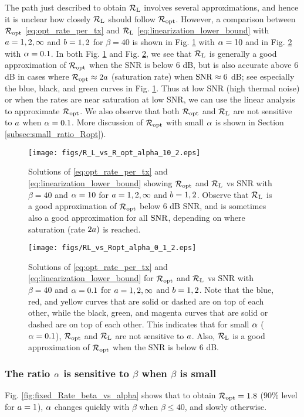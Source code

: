 \documentclass[12pt, draftclsnofoot,journal,onecolumn]{IEEEtran}
\begin{document}
The path just described to obtain $\mathcal{R}_{\rm L}$ involves several approximations, and hence it is unclear how closely $\mathcal{R}_{\rm L}$ should follow $\mathcal{R}_{\rm opt}$.
However, a comparison between $\mathcal{R}_{\rm opt}$ \eqref{eq:opt_rate_per_tx} and $\mathcal{R}_{\rm L}$ \eqref{eq:linearization_lower_bound} with $a=1, 2, \infty$ and $b=1, 2$ for $\beta= 40$ is shown in Fig. \ref{fig:compare_with_Bussgang} with $\alpha=10$ and in Fig. \ref{fig:RL_vs_Ropt_alpha_0.1} with $\alpha=0.1$. In both Fig. \ref{fig:compare_with_Bussgang} and Fig. \ref{fig:RL_vs_Ropt_alpha_0.1}, we see that $\mathcal{R}_{\rm L}$ is generally a good approximation of $\mathcal{R}_{\rm opt}$ when the SNR is below 6 dB, but is also accurate above 6 dB in cases where $\mathcal{R}_{\rm opt}\approx 2a$ (saturation rate) when ${\rm SNR}\approx 6$ dB; see especially the blue, black, and green curves in Fig. \ref{fig:compare_with_Bussgang}. Thus at low SNR (high thermal noise) or when the rates are near saturation at low SNR, we can use 
the linear analysis to approximate $\mathcal{R}_{\rm opt}$.  We also observe that both $\mathcal{R}_{\rm opt}$ and $\mathcal{R}_{\rm L}$ are not sensitive to $a$ when $\alpha=0.1$.  More discussion of $\mathcal{R}_{\rm opt}$ with small $\alpha$ is shown in Section \ref{subsec:small_ratio_Ropt}).
\begin{figure}
\texttt{[image: figs/R\_L\_vs\_R\_opt\_alpha\_10\_2.eps]}
\centering
    \caption{Solutions of \eqref{eq:opt_rate_per_tx} and \eqref{eq:linearization_lower_bound} showing $\mathcal{R}_{\rm opt}$ and $\mathcal{R}_{\rm L}$ vs SNR with $\beta=40$ and $\alpha=10$ for $a=1,2,\infty$ and $b=1,2$. Observe that $\mathcal{R}_{\rm L}$ is a good approximation of $\mathcal{R}_{\rm opt}$ below 6 dB SNR, and is sometimes also a good approximation for all ${\rm SNR}$, depending on where saturation (rate $2a)$ is reached.}
    \label{fig:compare_with_Bussgang}
\end{figure}
\begin{figure}
\texttt{[image: figs/RL\_vs\_Ropt\_alpha\_0\_1\_2.eps]}
\centering
    \caption{Solutions of \eqref{eq:opt_rate_per_tx} and \eqref{eq:linearization_lower_bound} for $\mathcal{R}_{\rm opt}$ and $\mathcal{R}_{\rm L}$ vs SNR with $\beta=40$ and $\alpha=0.1$ for $a=1,2,\infty$ and $b=1,2$. Note that the blue, red, and yellow curves that are solid or dashed are on top of each other, while the black, green, and magenta curves that are solid or dashed are on top of each other. This indicates that
    for small $\alpha$ ($\alpha=0.1$), $\mathcal{R}_{\rm opt}$ and $\mathcal{R}_{\rm L}$ are not sensitive to $a$. Also, $\mathcal{R}_{\rm L}$ is a good approximation of $\mathcal{R}_{\rm opt}$ when the SNR is below 6 dB.}
    \label{fig:RL_vs_Ropt_alpha_0.1}
\end{figure}
\subsubsection{The ratio $\alpha$ is sensitive to $\beta$ when $\beta$ is small}
Fig. \ref{fig:fixed_Rate_beta_vs_alpha} shows that to obtain $\mathcal{R}_{\rm opt}=1.8$ ($90\%$ level for $a=1$), $\alpha$ changes quickly with $\beta$ when $\beta\leq 40$, and slowly otherwise.
\end{document}

